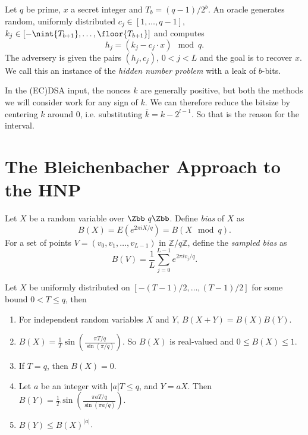 \begin{definition}
Let $q$ be prime, $x$ a secret integer and $T_b = (q-1)/2^b$. An oracle generates random, uniformly distributed $c_j \in [1,\ldots, q-1],$ $k_j \in [-\nint{T_{b+1}}, \ldots, \floor{T_{b+1}}]$ and computes 
\begin{equation}\label{eqHNP}
    h_j = (k_j - c_j \cdot x) \mod q.
\end{equation}
The adversery is given the pairs $(h_j, c_j)$, $0<j<L$ and the goal is to recover $x$. We call this an instance of the \textit{hidden number problem} with a leak of $b$-bits.
\end{definition}

In the (EC)DSA input, the nonces $k$ are generally positive, but both the methods we will consider work for any sign of $k$. We can therefore reduce the bitsize by centering $k$ around $0$, i.e. substituting $\bar{k} = k - 2^{l-1}$. So that is the reason for the interval.


\section{The Bleichenbacher Approach to the HNP}
\begin{definition}
    Let $X$ be a random variable over $\Zbb \ q \Zbb$. Define \textit{bias} of $X$ as 
    \begin{equation}
        B(X) = E(e^{2\pi i X / q}) = B(X \mod q).
        \tag{5}
        \end{equation}
        For a set of points $V = (v_0, v_1, \dots, v_{L-1})$ in $\mathbb{Z}/q\mathbb{Z}$, define the \textit{sampled bias} as
        \begin{equation}
        B(V) = \frac{1}{L} \sum_{j=0}^{L-1} e^{2\pi i v_j / q}.
        \tag{6}
    \end{equation}

    \begin{lemma}
        Let $X$ be uniformly distributed on $[-(T-1)/2, \ldots, (T-1)/2]$ for some bound $0 < T \leq q$, then
        \begin{enumerate}[label=\arabic*.]
            \item For independent random variables \(X\) and \(Y\), \(B(X + Y) = B(X)B(Y)\).
            \item \(B(X) = \frac{1}{T} \sin\left(\frac{\pi T / q}{\sin(\pi / q)}\right)\). So \(B(X)\) is real-valued and \(0 \leq B(X) \leq 1\).
            \item If $T = q$, then \(B(X) = 0\).
            \item Let \(a\) be an integer with \(|a|T \leq q\), and \(Y = aX\). Then \(B(Y) = \frac{1}{T} \sin\left(\frac{\pi a T / q}{\sin(\pi a / q)}\right)\).
            \item \(B(Y) \leq B(X)^{|a|}\).
        \end{enumerate} 
    \end{lemma}
\end{definition}

